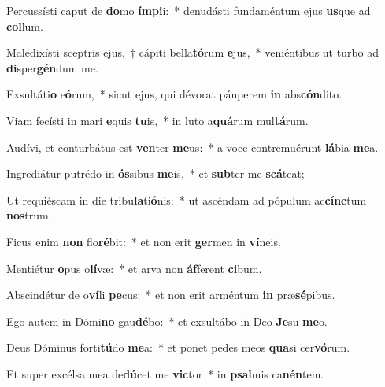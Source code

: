 \item Percussísti caput de \textbf{do}mo \textbf{ím}\textbf{pi}i:~* denudásti fundaméntum ejus \textbf{us}que ad \textbf{col}lum.
\item Maledixísti sceptris ejus,~† cápiti bella\textbf{tó}rum \textbf{e}jus,~* veniéntibus ut turbo ad \textbf{di}sper\textbf{gén}dum me.
\item Exsultáti\textbf{o} e\textbf{ó}rum,~* sicut ejus, qui dévorat páuperem \textbf{in} abs\textbf{cón}dito.
\item Viam fecísti in mari \textbf{e}quis \textbf{tu}is,~* in luto a\textbf{quá}rum mul\textbf{tá}rum.
\item Audívi, et conturbátus est \textbf{ven}ter \textbf{me}us:~* a voce contremuérunt \textbf{lá}bia \textbf{me}a.
\item Ingrediátur putrédo in \textbf{ós}sibus \textbf{me}is,~* et \textbf{sub}ter me \textbf{scá}teat;
\item Ut requiéscam in die tribu\textbf{la}ti\textbf{ó}nis:~* ut ascéndam ad pópulum ac\textbf{cínc}tum \textbf{nos}trum.
\item Ficus enim \textbf{non} flo\textbf{ré}bit:~* et non erit \textbf{ger}men in \textbf{ví}neis.
\item Mentiétur \textbf{o}pus o\textbf{lí}væ:~* et arva non \textbf{áf}ferent \textbf{ci}bum.
\item Abscindétur de o\textbf{ví}li \textbf{pe}cus:~* et non erit arméntum \textbf{in} præ\textbf{sé}pibus.
\item Ego autem in Dómi\textbf{no} gau\textbf{dé}bo:~* et exsultábo in Deo \textbf{Je}su \textbf{me}o.
\item Deus Dóminus forti\textbf{tú}do \textbf{me}a:~* et ponet pedes meos \textbf{qua}si cer\textbf{vó}rum.
\item Et super excélsa mea de\textbf{dú}cet me \textbf{vic}tor~* in \textbf{psal}mis ca\textbf{nén}tem.
